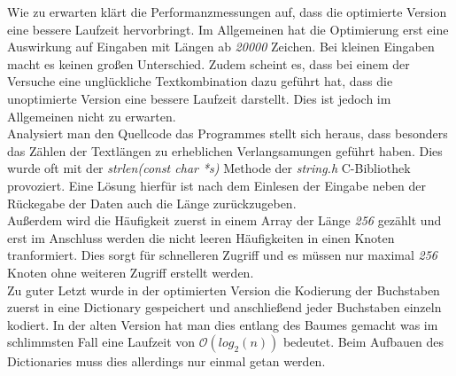 \documentclass[course=erap]{aspdoc}
\begin{document}
\begin{center}
\end{center}
Wie zu erwarten klärt die Performanzmessungen auf, dass die optimierte Version eine bessere Laufzeit hervorbringt. Im Allgemeinen hat die Optimierung erst eine Auswirkung auf Eingaben mit Längen ab \textit{20000} Zeichen. Bei kleinen Eingaben macht es keinen großen Unterschied. Zudem scheint es, dass bei einem der Versuche eine unglückliche Textkombination dazu geführt hat, dass die unoptimierte Version eine bessere Laufzeit darstellt. Dies ist jedoch im Allgemeinen nicht zu erwarten.\\
Analysiert man den Quellcode das Programmes stellt sich heraus, dass besonders das Zählen der Textlängen zu erheblichen Verlangsamungen geführt haben. Dies wurde oft mit der \textit{strlen(const char *s)} Methode der \textit{string.h} C-Bibliothek provoziert. Eine Lösung hierfür ist nach dem Einlesen der Eingabe neben der Rückegabe der Daten auch die Länge zurückzugeben.\\
Außerdem wird die Häufigkeit zuerst in einem Array der Länge \textit{256} gezählt und erst im Anschluss werden die nicht leeren Häufigkeiten in einen Knoten tranformiert. Dies sorgt für schnelleren Zugriff und es müssen nur maximal \textit{256} Knoten ohne weiteren Zugriff erstellt werden.\\
Zu guter Letzt wurde in der optimierten Version die Kodierung der Buchstaben zuerst in eine Dictionary gespeichert und anschließend jeder Buchstaben einzeln kodiert. In der alten Version hat man dies entlang des Baumes gemacht was im schlimmsten Fall eine Laufzeit von $\mathcal{O}(log_2(n))$ bedeutet. Beim Aufbauen des Dictionaries muss dies allerdings nur einmal getan werden.\\
\end{document}
